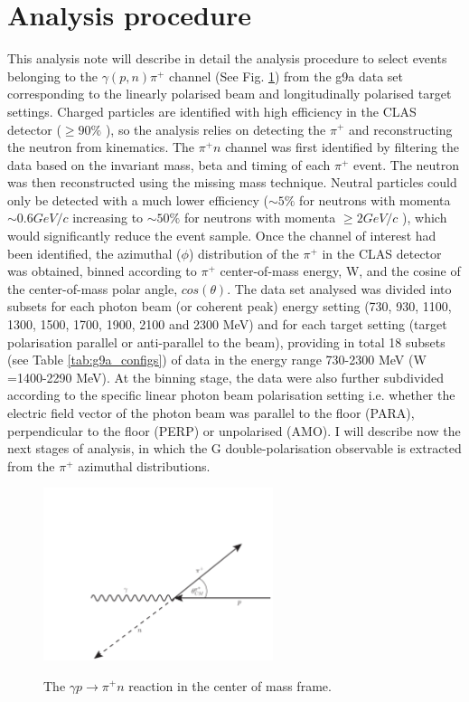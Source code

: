 \section{Analysis procedure}
This analysis note will describe in detail the analysis procedure to select events belonging to the $\gamma (p,n) \pi^+$ channel (See Fig. \ref{fig:frost_diagram}) from the g9a data set corresponding to the linearly polarised beam and longitudinally polarised target settings. Charged particles are identified with high efficiency in the CLAS detector ($\geq90\%$ \cite{Mecking2003}), so the analysis relies on detecting the $\pi^+$ and reconstructing the neutron from kinematics. The $\pi^+ n$ channel was first identified by filtering the data based on the invariant mass, beta and timing of each $\pi^+$ event. The neutron was then reconstructed using the missing mass technique. Neutral particles could only be detected with a much lower efficiency ($\sim5\%$ for neutrons with momenta $\sim 0.6 GeV/c$ increasing to $\sim 50\%$ for neutrons with momenta $\geq2 GeV/c$  \cite{Mecking2003}), which would significantly reduce the event sample. Once the channel of interest had been identified, the azimuthal ($\phi$) distribution of the $\pi^+$ in the CLAS detector was obtained, binned according to $\pi^+$ center-of-mass energy, W, and the cosine of the center-of-mass polar angle, $cos(\theta)$. The data set analysed  was divided into subsets for each photon beam (or coherent peak) energy setting (730, 930, 1100, 1300, 1500, 1700, 1900, 2100 and 2300 MeV) and for each target setting (target polarisation parallel or anti-parallel to the beam), providing in total 18 subsets (see Table \ref{tab:g9a_configs}) of data in the energy range 730-2300 MeV (W =1400-2290 MeV). At the binning stage, the data were also further subdivided according to the specific linear photon beam polarisation setting i.e. whether the electric field vector of the photon beam was parallel to the floor (PARA), perpendicular to the floor (PERP) or unpolarised (AMO). I will describe now the next stages of analysis, in which the G double-polarisation observable is extracted from the $\pi^+$ azimuthal distributions.
\begin{figure}[htb]
  \begin{center}
    \includegraphics[width=0.6\textwidth]{figures/frost_reaction.pdf} \\
    \caption{The $\gamma p \rightarrow \pi^+ n $ reaction in the center of mass frame. }
    \label{fig:frost_diagram}
  \end{center}
\end{figure}


